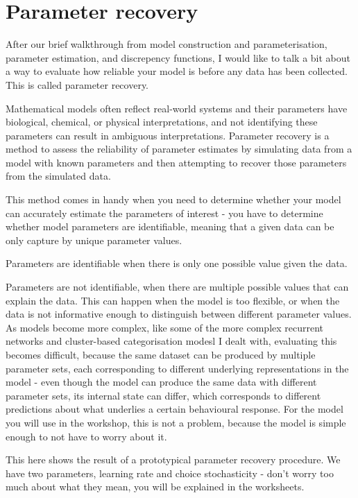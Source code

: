 \documentclass[12pt]{article}
\begin{document}
\section{Parameter recovery}

After our brief walkthrough from model construction and parameterisation, parameter estimation, and discrepency functions, I would like to talk a bit about a way to evaluate how reliable your model is before any data has been collected. This is called parameter recovery.

Mathematical models often reflect real-world systems and their parameters have biological, chemical, or physical interpretations, and not identifying these parameters can result in ambiguous interpretations. Parameter recovery is a method to assess the reliability of parameter estimates by simulating data from a model with known parameters and then attempting to recover those parameters from the simulated data.

This method comes in handy when you need to determine whether your model can accurately estimate the parameters of interest - you have to determine whether model parameters are identifiable, meaning that a given data can be only capture by unique parameter values.

Parameters are identifiable when there is only one possible value given the data.

Parameters are not identifiable, when there are multiple possible values that can explain the data. This can happen when the model is too flexible, or when the data is not informative enough to distinguish between different parameter values. As models become more complex, like some of the more complex recurrent networks and cluster-based categorisation modesl I dealt with, evaluating this becomes difficult, because the same dataset can be produced by multiple parameter sets, each corresponding to different underlying representations in the model - even though the model can produce the same data with different parameter sets, its internal state can differ, which corresponds to different predictions about what underlies a certain behavioural response. For the model you will use in the workshop, this is not a problem, because the model is simple enough to not have to worry about it.

This here shows the result of a prototypical parameter recovery procedure. We have two parameters, learning rate and choice stochasticity - don't worry too much about what they mean, you will be explained in the worksheets.
\end{document}
